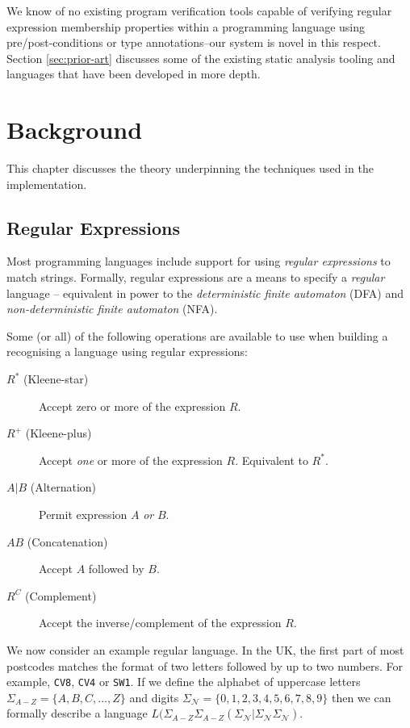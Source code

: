 \documentclass[a4paper,openany,12pt]{book}
\begin{document}
We know of no existing program verification tools capable of verifying regular expression membership properties
within a programming language using pre/post-conditions or type annotations--our system is novel in this respect.
Section \ref{sec:prior-art} discusses some of the existing static analysis tooling and languages that have been
developed in more depth.

\chapter{Background}
This chapter discusses the theory underpinning the techniques used in the implementation.

\section{Regular Expressions}
\label{regexbg}

Most programming languages include support for using \emph{regular expressions} to match strings. Formally, regular
expressions are a means to specify a \emph{regular} language -- equivalent in power to the \emph{deterministic finite
automaton} (DFA) and \emph{non-deterministic finite automaton} (NFA).

Some (or all) of the following operations are available to use when building a recognising a language using regular
expressions:

\begin{description}
    \item[$R^*$ (Kleene-star)] Accept zero or more of the expression $R$.
    \item[$R^+$ (Kleene-plus)] Accept \emph{one} or more of the expression $R$. Equivalent to ${R^*}$.
    \item[$A \vert{} B$ (Alternation)] Permit expression $A$ \emph{or} $B$.
    \item[$AB$ (Concatenation)] Accept $A$ followed by $B$.
    \item[$R^C$ (Complement)] Accept the inverse/complement of the expression $R$.
\end{description}


We now consider an example regular language. In the UK, the first part of most postcodes matches the format of two
letters followed by up to two numbers. For example, \texttt{CV8}, \texttt{CV4} or \texttt{SW1}.
If we define the alphabet of uppercase letters $\Sigma_{A-Z} = \{A, B, C, \ldots, Z\}$ and digits $\Sigma_\mathcal{N} =
\{0,1,2,3,4,5,6,7,8,9\}$ then we can formally describe a language $L(\Sigma_{A-Z} \Sigma_{A-Z}(\Sigma_\mathcal{N} |
\Sigma_\mathcal{N} \Sigma_\mathcal{N})$.
\end{document}
